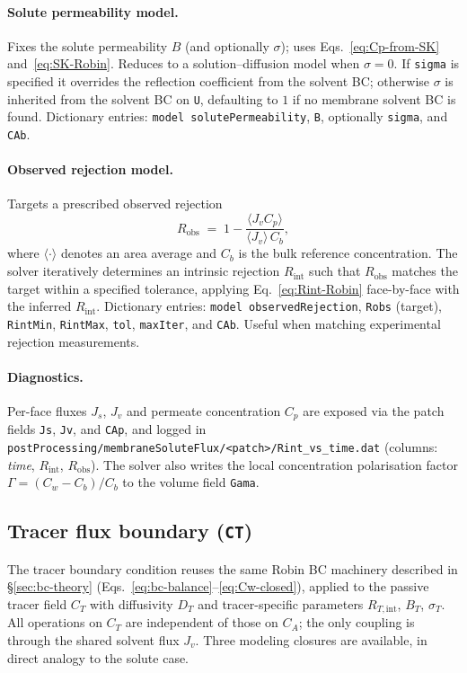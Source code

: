 \documentclass[11pt,a4paper]{article}
\begin{document}
\paragraph{Solute permeability model.}
Fixes the solute permeability \(B\) (and optionally \(\sigma\)); uses
Eqs.~\eqref{eq:Cp-from-SK} and~\eqref{eq:SK-Robin}. Reduces to a
solution--diffusion model when \(\sigma = 0\). If \texttt{sigma} is
specified it overrides the reflection coefficient from the solvent
BC; otherwise \(\sigma\) is inherited from the solvent BC on
\texttt{U}, defaulting to \(1\) if no membrane solvent BC is found.
Dictionary entries: \texttt{model solutePermeability}, \texttt{B},
optionally \texttt{sigma}, and \texttt{CAb}.

\paragraph{Observed rejection model.}
Targets a prescribed observed rejection
\begin{equation}
	R_\mathrm{obs} \;=\; 1 - \frac{\langle J_v C_p \rangle}{\langle J_v \rangle\,C_b} ,
	\label{eq:Robs-def}
\end{equation}
where \(\langle\cdot\rangle\) denotes an area average and \(C_b\) is
the bulk reference concentration. The solver iteratively determines
an intrinsic rejection \(R_\mathrm{int}\) such that
\(R_\mathrm{obs}\) matches the target within a specified tolerance,
applying Eq.~\eqref{eq:Rint-Robin} face-by-face with the inferred
\(R_\mathrm{int}\). Dictionary entries: \texttt{model
observedRejection}, \texttt{Robs} (target), \texttt{RintMin},
\texttt{RintMax}, \texttt{tol}, \texttt{maxIter}, and \texttt{CAb}.
Useful when matching experimental rejection measurements.

\paragraph{Diagnostics.}
Per-face fluxes \(J_s\), \(J_v\) and permeate concentration \(C_p\)
are exposed via the patch fields \texttt{Js}, \texttt{Jv}, and
\texttt{CAp}, and logged in
\texttt{postProcessing/membraneSoluteFlux/<patch>/Rint\_vs\_time.dat}
(columns: \emph{time}, \(R_\mathrm{int}\), \(R_\mathrm{obs}\)). The
solver also writes the local concentration polarisation factor
\(\Gamma = (C_w - C_b)/C_b\) to the volume field \texttt{Gama}.


\subsection{Tracer flux boundary (\texttt{CT})}
\label{sec:bc-tracer}
The tracer boundary condition reuses the same Robin BC machinery
described in \S\ref{sec:bc-theory} (Eqs.~\eqref{eq:bc-balance}--\eqref{eq:Cw-closed}),
applied to the passive tracer field \(C_T\) with diffusivity \(D_T\)
and tracer-specific parameters \(R_{T,\mathrm{int}}\), \(B_T\),
\(\sigma_T\). All operations on \(C_T\) are independent of those on
\(C_A\); the only coupling is through the shared solvent flux
\(J_v\). Three modeling closures are available, in direct analogy to
the solute case.
\end{document}
